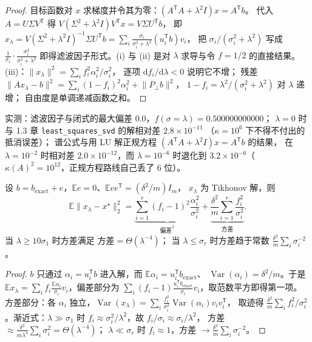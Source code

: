 \begin{proof}
目标函数对 $x$ 求梯度并令其为零：$(A^{\mathsf T}A+\lambda^2I)x=A^{\mathsf T}b$。
代入 $A=U\Sigma V^{\mathsf T}$ 得 $V(\Sigma^2+\lambda^2I)V^{\mathsf T}x=V\Sigma U^{\mathsf T}b$，
即 $x_\lambda=V(\Sigma^2+\lambda^2I)^{-1}\Sigma U^{\mathsf T}b
=\sum_i\frac{\sigma_i}{\sigma_i^2+\lambda^2}(u_i^{\mathsf T}b)v_i$，
把 $\sigma_i/(\sigma_i^2+\lambda^2)$ 写成 $\frac{1}{\sigma_i}\cdot\frac{\sigma_i^2}{\sigma_i^2+\lambda^2}$
即得滤波因子形式。(i) 与 (ii) 是对 $\lambda$ 求导与令 $f=1/2$ 的直接结果。
(iii)：$\lVert x_\lambda\rVert^2=\sum_i f_i^2\alpha_i^2/\sigma_i^2$，
逐项 $\mathrm{d}f_i/\mathrm{d}\lambda<0$ 说明它不增；
残差 $\lVert Ax_\lambda-b\rVert^2=\sum_i(1-f_i)^2\alpha_i^2+\lVert P_\perp b\rVert^2$，
$1-f_i=\lambda^2/(\sigma_i^2+\lambda^2)$ 对 $\lambda$ 递增；
自由度是单调递减函数之和。
\end{proof}

实测：滤波因子与闭式的最大偏差 $0.0$，$f(\sigma=\lambda)=0.500000000000$；
$\lambda=0$ 时与 1.3 章 \texttt{least\_squares\_svd} 的解相对差 $2.8\times10^{-11}$
（$\kappa=10^6$ 下不得不付出的抵消误差）；
谱公式与用 LU 解正规方程 $(A^{\mathsf T}A+\lambda^2I)x=A^{\mathsf T}b$ 的结果，
在 $\lambda=10^{-2}$ 时相对差 $2.0\times10^{-12}$，而 $\lambda=10^{-6}$ 时退化到
$3.2\times10^{-6}$（$\kappa(A)^2=10^{12}$，正规方程路线自己丢了 $6$ 位）。

\begin{theorem}[偏差-方差分解与方差的两段幂律]
\label{thm:biasvar}
设 $b=b_{\text{exact}}+e$，$\mathbb{E}e=0$、$\mathbb{E}ee^{\mathsf T}=(\delta^2/m)I_m$，
$x_\lambda$ 为 Tikhonov 解，则
\[
  \mathbb{E}\lVert x_\lambda-x^\star\rVert_2^2
  =\underbrace{\sum_{i=1}^{r}(f_i-1)^2\frac{\alpha_i^2}{\sigma_i^2}}_{\text{偏差}^2}
  +\underbrace{\frac{\delta^2}{m}\sum_{i=1}^{r}\frac{f_i^2}{\sigma_i^2}}_{\text{方差}} .
\]
当 $\lambda\ge10\sigma_1$ 时方差满足 $\text{方差}=\Theta(\lambda^{-4})$；
当 $\lambda\le\sigma_r$ 时方差趋于常数 $\frac{\delta^2}{m}\sum_i\sigma_i^{-2}$。
\end{theorem}

\begin{proof}
$b$ 只通过 $\alpha_i=u_i^{\mathsf T}b$ 进入解，而 $\mathbb{E}\alpha_i=u_i^{\mathsf T}b_{\text{exact}}$、
$\operatorname{Var}(\alpha_i)=\delta^2/m$。于是
$\mathbb{E}x_\lambda=\sum_i f_i\frac{\mathbb{E}\alpha_i}{\sigma_i}v_i$，偏差部分为
$\sum_i(f_i-1)\frac{u_i^{\mathsf T}b_{\text{exact}}}{\sigma_i}v_i$，取范数平方即得第一项。
方差部分：各 $\alpha_i$ 独立，$\operatorname{Var}(x_\lambda)=\sum_i\frac{f_i^2}{\sigma_i^2}\operatorname{Var}(\alpha_i)v_iv_i^{\mathsf T}$，
取迹得 $\frac{\delta^2}{m}\sum_if_i^2/\sigma_i^2$。渐近式：$\lambda\gg\sigma_1$ 时
$f_i\approx\sigma_i^2/\lambda^2$，故 $f_i/\sigma_i\approx\sigma_i/\lambda^2$，
方差 $\approx\frac{\delta^2}{m\lambda^4}\sum_i\sigma_i^2=\Theta(\lambda^{-4})$；
$\lambda\ll\sigma_r$ 时 $f_i\approx1$，方差 $\to\frac{\delta^2}{m}\sum_i\sigma_i^{-2}$。
\end{proof}

